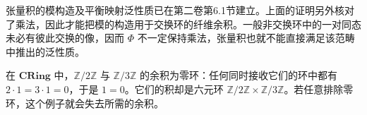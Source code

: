张量积的模构造及平衡映射泛性质已在第二卷第6.1节建立。上面的证明另外核对了乘法，因此才能把模的构造用于交换环的纤维余积。一般非交换环中的一对同态未必有彼此交换的像，因而 \(\Phi\) 不一定保持乘法，张量积也就不能直接满足该范畴中推出的泛性质。

\begin{example}[余积可能成为零环]\label{b4:exm:ring-zero-coproduct}
	在 \(\mathbf{CRing}\) 中，\(\mathbb Z/2\mathbb Z\) 与 \(\mathbb Z/3\mathbb Z\) 的余积为零环：任何同时接收它们的环中都有 \(2\cdot1=3\cdot1=0\)，于是 \(1=0\)。它们的积却是六元环 \(\mathbb Z/2\mathbb Z\times\mathbb Z/3\mathbb Z\)。若任意排除零环，这个例子就会失去所需的余积。
\end{example}
